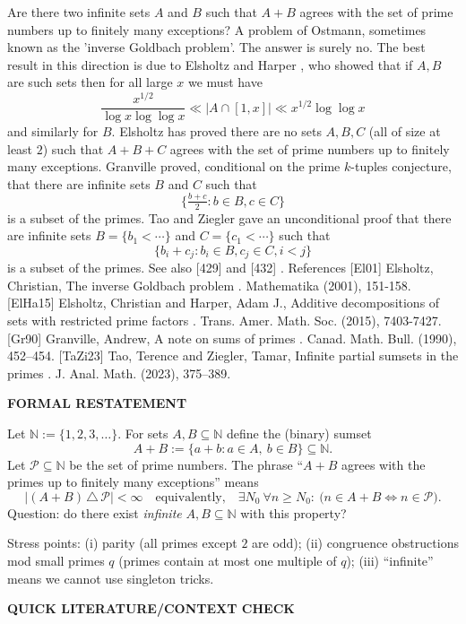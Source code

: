 Are there two infinite sets $A$ and $B$ such that $A+B$ agrees with the set of prime numbers up to finitely many exceptions? A problem of Ostmann, sometimes known as the 'inverse Goldbach problem'. The answer is surely no. The best result in this direction is due to Elsholtz and Harper \cite{ElHa15}, who showed that if $A,B$ are such sets then for all large $x$ we must have\[\frac{x^{1/2}}{\log x\log\log x} \ll \lvert A \cap [1,x]\rvert \ll x^{1/2}\log\log x\]and similarly for $B$. Elsholtz \cite{El01} has proved there are no sets $A,B,C$ (all of size at least $2$) such that $A+B+C$ agrees with the set of prime numbers up to finitely many exceptions. Granville \cite{Gr90} proved, conditional on the prime $k$-tuples conjecture, that there are infinite sets $B$ and $C$ such that\[\{ \tfrac{b+c}{2}: b\in B, c\in C\}\]is a subset of the primes. Tao and Ziegler \cite{TaZi23} gave an unconditional proof that there are infinite sets $B=\{b_1<\cdots\}$ and $C=\{c_1<\cdots\}$ such that\[\{ b_i+c_j : b_i\in B, c_j\in C, i<j\}\]is a subset of the primes. See also [429] and [432] . References [El01] Elsholtz, Christian, The inverse Goldbach problem . Mathematika (2001), 151-158. [ElHa15] Elsholtz, Christian and Harper, Adam J., Additive decompositions of sets with restricted prime factors . Trans. Amer. Math. Soc. (2015), 7403-7427. [Gr90] Granville, Andrew, A note on sums of primes . Canad. Math. Bull. (1990), 452--454. [TaZi23] Tao, Terence and Ziegler, Tamar, Infinite partial sumsets in the primes . J. Anal. Math. (2023), 375--389.


\medskip
\noindent\textbf{FORMAL RESTATEMENT}

Let $\mathbb N:=\{1,2,3,\dots\}$. For sets $A,B\subseteq\mathbb N$ define the (binary) sumset
\[
A+B := \{a+b : a\in A,\ b\in B\}\subseteq \mathbb N.
\]
Let $\mathcal P\subseteq\mathbb N$ be the set of prime numbers. The phrase ``$A+B$ agrees with the primes up to finitely many exceptions'' means
\[
\lvert (A+B)\,\triangle\,\mathcal P\rvert <\infty
\quad\text{equivalently,}\quad
\exists N_0\ \forall n\ge N_0:\ \bigl(n\in A+B \iff n\in\mathcal P\bigr).
\]
Question: do there exist \emph{infinite} $A,B\subseteq\mathbb N$ with this property?

Stress points:
(i) parity (all primes except $2$ are odd);
(ii) congruence obstructions mod small primes $q$ (primes contain at most one multiple of $q$);
(iii) ``infinite'' means we cannot use singleton tricks.

\medskip
\noindent\textbf{QUICK LITERATURE/CONTEXT CHECK}

